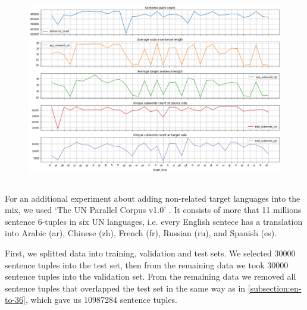 \begin{figure}[h]
	\centering
	\includegraphics[width=1.0\columnwidth]{img/train_set_statistics.png}
	\label{fig:language_statistics}
\end{figure}



\subsection{}
\label{subsection:en-to-5}

For an additional experiment about adding non-related target languages
into the mix, we used `The UN Parallel Corpus v1.0'
.
It consists of more that 11 millions sentence 6-tuples in six UN languages,
i.e. every English sentece has a translation into Arabic (ar), Chinese (zh),
French (fr), Russian (ru), and Spanish (es).

First, we splitted data into training, validation and test sets.
We selected 30000 sentence tuples into the test set, then from the remaining
data we took 30000 sentence tuples into the validation set.
From the remaining data we removed all sentence tuples that overlapped the
test set in the same way as in \cref{subsection:en-to-36}, which gave us
10987284 sentence tuples.

